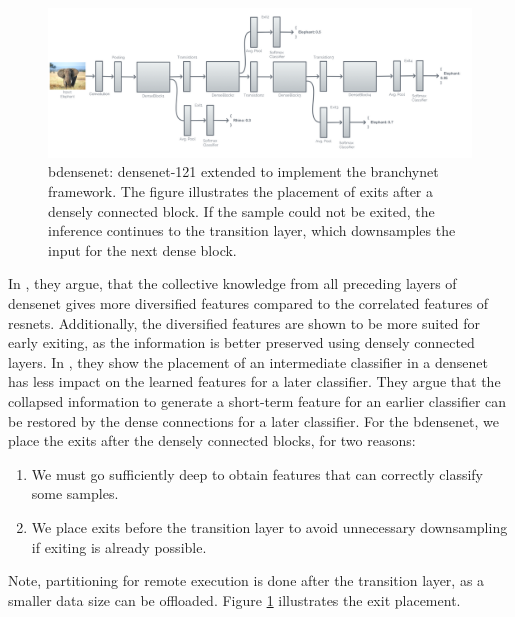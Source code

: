 \begin{figure}
	\centering
	\includegraphics[width=\linewidth]{figures/models/b-densenet}
	\caption[B-\gls{densenet} architecture]{\gls{bdensenet}: \gls{densenet}-121 extended to implement the \gls{branchynet} framework. The figure illustrates the placement of exits after a densely connected block. If the sample could not be exited, the inference continues to the transition layer, which downsamples the input for the next dense block. }
	\label{fig:b-densenet}
\end{figure}

In \cite{huang_multi-scale_2017}, they argue, that the collective knowledge from all preceding layers of \gls{densenet} gives more diversified features compared to the correlated features of \gls{resnet}s. Additionally, the diversified features are shown to be more suited for early exiting, as the information is better preserved using densely connected layers. In \cite{huang_multi-scale_2017}, they show the placement of an intermediate classifier in a \gls{densenet} has less impact on the learned features for a later classifier. They argue that the collapsed information to generate a short-term feature for an earlier classifier can be restored by the dense connections for a later classifier. 
For the \gls{bdensenet}, we place the exits after the densely connected blocks, for two reasons: 

\begin{enumerate}
	\item We must go sufficiently deep to obtain features that can correctly classify some samples.
	\item We place exits before the transition layer to avoid unnecessary downsampling if exiting is already possible. 
\end{enumerate}

Note, partitioning for remote execution is done after the transition layer, as a smaller data size can be offloaded. Figure \ref{fig:b-densenet} illustrates the exit placement.

